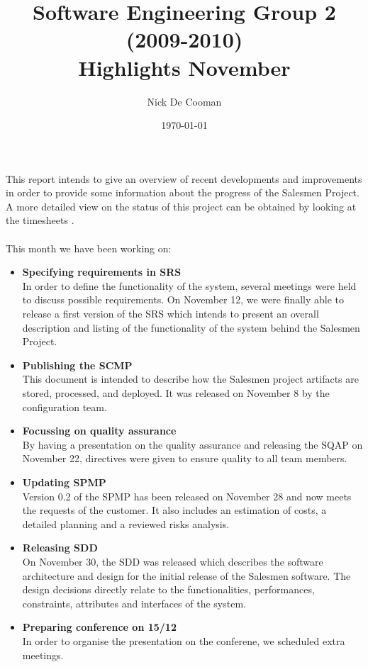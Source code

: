 \documentclass{article}
\begin{document}
	\title{Software Engineering Group 2 (2009-2010) \\ Highlights November}
	\author{Nick De Cooman}
	\date {\today}

\maketitle

This report intends to give an overview of recent developments and improvements in order to provide some information about the progress of the Salesmen Project. A more detailed view on the status of this project can be obtained by looking at the timesheets \cite{timesheets}. \\
\\
This month we have been working on:

\begin{itemize}
	
	
	\item \textbf{Specifying requirements in SRS} \\
	In order to define the functionality of the system, several meetings were held to discuss possible requirements. On November 12, we were finally able to release a first version of the SRS \cite{srs} which intends to present an overall description and listing of the functionality of the system behind the Salesmen Project.
	
	\item \textbf{Publishing the SCMP} \\
	This document \cite{scmp} is intended to describe how the Salesmen project artifacts are stored, processed, and deployed. It was released on November 8 by the configuration team. 
	
	\item \textbf{Focussing on quality assurance} \\
	By having a presentation on the quality assurance and releasing the SQAP \cite{sqap} on November 22, directives were given to ensure quality to all team members.
	
	\item \textbf{Updating SPMP} \\
Version 0.2 of the SPMP \cite{spmp} has been released on November 28 and now meets the requests of the customer. It also includes an estimation of costs, a detailed planning and a reviewed risks analysis. 
	
	\item \textbf{Releasing SDD} \\
	On November 30, the SDD \cite{sdd} was released which describes the software architecture and design for the initial release of the Salesmen software. The design decisions directly relate to the functionalities, performances, constraints, attributes and interfaces of the system.
	
	\item \textbf{Preparing conference on 15/12} \\
	In order to organise the presentation on the conferene, we scheduled extra meetings.
		
\end{itemize}
  
\end{document}

